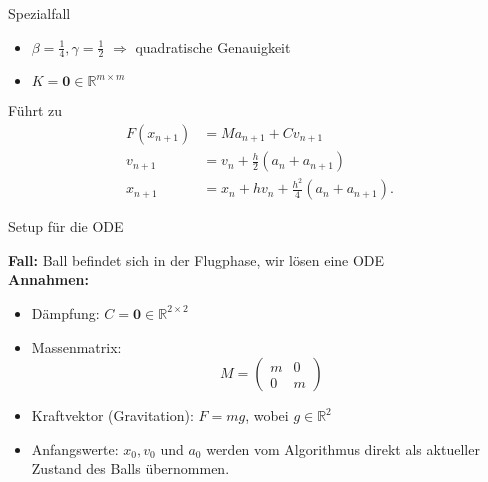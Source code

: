 \documentclass{beamer}
\begin{document}
\begin{frame}{Spezialfall}
	
\begin{itemize}
	\item  $\beta = \frac{1}{4}, \gamma = \frac{1}{2}$ $\Rightarrow$ quadratische Genauigkeit
	\item $K = \mathbf{0} \in \mathbb{R}^{m \times m}$  
\end{itemize}
Führt zu
\begin{align*}
	F(x_{n+1}) &= M a_{n+1} + C v_{n+1}\\
	v_{n+1} &= v_n + \frac{h}{2} (a_n + a_{n+1})\\
	x_{n+1} &= x_n + h v_n + \frac{h^2}{4} (a_n + a_{n+1}).
\end{align*}

\end{frame}

\begin{frame}{Setup für die ODE}

\textbf{Fall:} Ball befindet sich in der Flugphase, wir lösen eine ODE\\
\vspace{0.3cm}
\textbf{Annahmen:}
	\begin{itemize}
		\item Dämpfung: $C = \mathbf{0} \in \mathbb{R}^{2 \times 2}$
		\item Massenmatrix:
		\[
		M =
		\begin{pmatrix}
			m & 0 \\
			0 & m
		\end{pmatrix}
		\]
		\item Kraftvektor (Gravitation): \quad $F = m g$, \quad wobei $g \in \mathbb{R}^2$
		\item Anfangswerte: $x_0, v_0$ und $a_0$ werden vom Algorithmus direkt als aktueller Zustand des Balls übernommen.
	\end{itemize} 

\end{frame}
\end{document}
